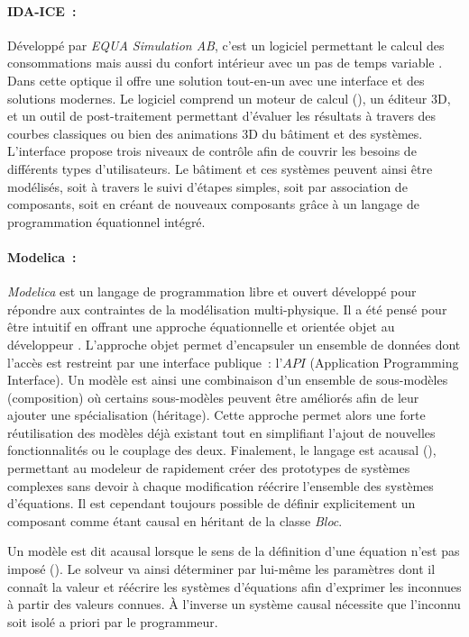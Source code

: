 \paragraph{IDA-ICE~:} %
\label{par:ida_ice}
Développé par \textit{EQUA Simulation AB}, c’est un logiciel permettant le calcul des
consommations mais aussi du confort intérieur avec un pas de temps variable
\parencite{Kalamees2004}. Dans cette optique il offre une solution tout-en-un avec une
interface et des solutions modernes. Le logiciel comprend un moteur de calcul (),
un éditeur $3$D, et un outil de post-traitement permettant d’évaluer les résultats à
travers des courbes classiques ou bien des animations $3$D du bâtiment et des systèmes.
L’interface propose trois niveaux de contrôle afin de couvrir les besoins de différents
types d’utilisateurs. Le bâtiment et ces systèmes peuvent ainsi être modélisés, soit à
travers le suivi d’étapes simples, soit par association de composants, soit en créant de nouveaux
composants grâce à un langage de programmation équationnel intégré.

\paragraph{Modelica~:} %
\label{par:modelica_}
\textit{Modelica} est un langage de programmation libre et ouvert
développé pour répondre aux contraintes de la modélisation multi-physique. Il a été pensé
pour être intuitif en offrant une approche équationnelle et orientée objet au développeur
\parencite{Wetter2016290}.
L’approche objet permet d’encapsuler un ensemble de données dont l’accès est restreint par
une interface publique~: l’$API$ (Application Programming Interface). Un modèle est
ainsi une combinaison d’un ensemble de sous-modèles (composition) où certains sous-modèles
peuvent être améliorés afin de leur ajouter une spécialisation (héritage). Cette
approche permet alors une forte réutilisation des modèles déjà existant tout en
simplifiant l’ajout de nouvelles fonctionnalités ou le couplage des deux. Finalement, le
langage est acausal (), permettant au modeleur de rapidement
créer des prototypes de systèmes complexes sans devoir à chaque modification réécrire
l’ensemble des systèmes d’équations. Il est cependant toujours possible de définir
explicitement un composant comme étant causal en héritant de la classe \textit{Bloc}.

\begin{Def}[Acausal]\label{def:acausal}
Un modèle est dit acausal lorsque le sens de la définition d’une équation n’est pas
imposé (). Le solveur va ainsi déterminer par lui-même les
paramètres dont il connaît la valeur et réécrire les systèmes d’équations afin d’exprimer
les inconnues à partir des valeurs connues. À l’inverse un système causal nécessite
que l’inconnu soit isolé a priori par le programmeur.
\end{Def}

